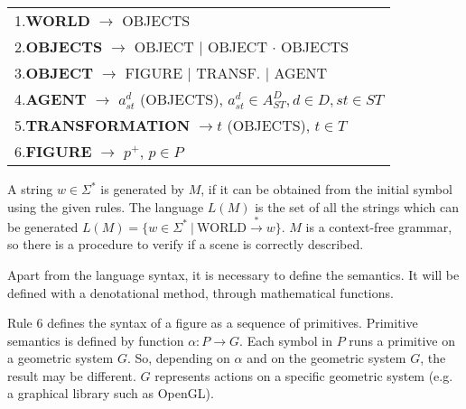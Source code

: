 \documentclass[a4paper,twoside]{article}
\begin{document}
\begin{table}[h]
\label{tab:rules}
\begin{small}
\begin{center}
\begin{tabular}{|l|}

    \hline

1.\textbf{WORLD} $\rightarrow$ OBJECTS \\

2.\textbf{OBJECTS} $\rightarrow$ OBJECT $|$ OBJECT $\cdot$ OBJECTS \\

3.\textbf{OBJECT} $\rightarrow$ FIGURE $|$ TRANSF. $|$ AGENT \\

4.\textbf{AGENT} $\rightarrow$ $a^d_{st}$ (OBJECTS), $a^d_{st} \in A^D_{ST}, d \in D, st \in ST$ \\

5.\textbf{TRANSFORMATION} $\rightarrow t$ (OBJECTS), $t \in T$ \\

6.\textbf{FIGURE} $\rightarrow$ $p^+$, $p \in P$ \\

    \hline

\end{tabular}
\end{center}
\end{small}
\vspace{-0.3cm}
\end{table}


A string $w \in \Sigma^*$ is generated by $M$, if it can be obtained from the initial symbol using
the given rules. The language $L(M)$ is the set of all the strings which can be generated $L(M) =
\lbrace w \in \Sigma^* \ | \ \text{WORLD} \stackrel{*}{\rightarrow} w \rbrace$. $M$ is a
context-free grammar, so there is a procedure to verify if a scene is correctly described.

Apart from the language syntax, it is necessary to define the semantics. It will be defined with a
denotational method, through mathematical functions.

Rule 6 defines the syntax of a figure as a sequence of primitives. Primitive semantics is defined
by function $\alpha: P \rightarrow G$. Each symbol in $P$ runs a primitive on a geometric system
$G$. So, depending on $\alpha$ and on the geometric system $G$, the result may be different. $G$
represents actions on a specific geometric system (e.g. a graphical library such as OpenGL).
\end{document}
